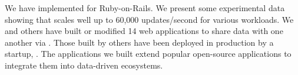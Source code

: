 We have implemented \synapse for Ruby-on-Rails. We present some experimental
data showing that \synapse scales well up to 60,000 updates/second for various
workloads.  We and others have built or modified 14 web applications to share
data with one another via \synapse. Those built by others have been deployed in
production by a startup, \crowdtap.  The applications we built extend popular
open-source applications to integrate them into data-driven ecosystems.
